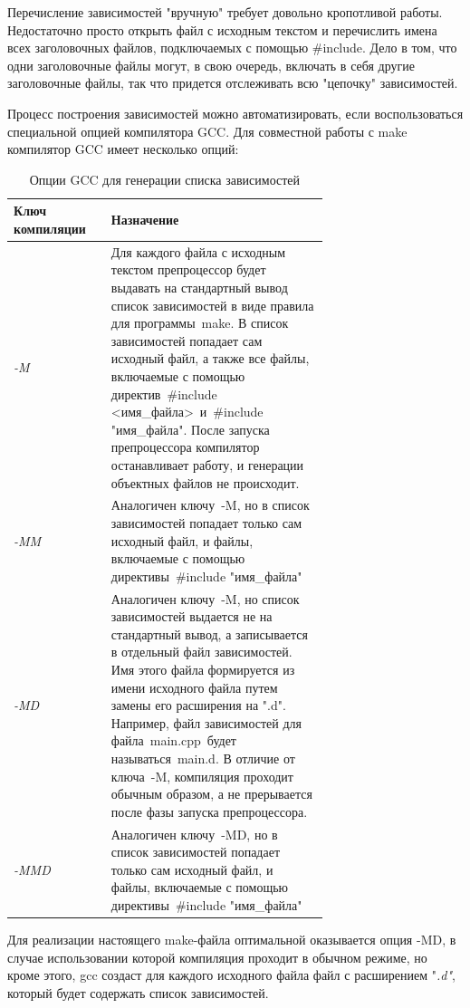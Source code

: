 \documentclass[a4paper,14pt]{extarticle}
\begin{document}
Перечисление зависимостей "вручную" требует довольно кропотливой работы. Недостаточно просто открыть файл с исходным текстом и перечислить имена всех заголовочных файлов, подключаемых с помощью \#include. Дело в том, что одни заголовочные файлы могут, в свою очередь, включать в себя другие заголовочные файлы, так что придется отслеживать всю "цепочку" зависимостей.

Процесс построения зависимостей можно автоматизировать, если воспользоваться специальной опцией компилятора GCC. Для совместной работы с make компилятор GCC имеет несколько опций:

\begin{table}[htbp]
	\small
	\caption{Опции GCC для генерации списка зависимостей}
	\begin{tabular}{|l|p{0.69\linewidth}|}
		\hline
		Ключ компиляции & Назначение \\ \hline
		\textit{-M} & Для каждого файла с исходным текстом препроцессор будет выдавать на стандартный вывод список зависимостей в виде правила для программы make. В список зависимостей попадает сам исходный файл, а также все файлы, включаемые с помощью директив \#include <имя\_файла> и \#include "имя\_файла". После запуска препроцессора компилятор останавливает работу, и генерации объектных файлов не происходит. \\ \hline
		\textit{-MM} & Аналогичен ключу -M, но в список зависимостей попадает только сам исходный файл, и файлы, включаемые с помощью директивы \#include "имя\_файла" \\ \hline
		\textit{-MD} & Аналогичен ключу -M, но список зависимостей выдается не на стандартный вывод, а записывается в отдельный файл зависимостей. Имя этого файла формируется из имени исходного файла путем замены его расширения на ".d". Например, файл зависимостей для файла main.cpp будет называться main.d. В отличие от ключа -M, компиляция проходит обычным образом, а не прерывается после фазы запуска препроцессора. \\ \hline
		\textit{-MMD} & Аналогичен ключу -MD, но в список зависимостей попадает только сам исходный файл, и файлы, включаемые с помощью директивы \#include "имя\_файла" \\ \hline
	\end{tabular}
	\label{tab:gcc-flags}
\end{table}


Для реализации настоящего make-файла оптимальной оказывается опция -MD, в случае использовании которой компиляция проходит в обычном режиме, но кроме этого, gcc создаст для каждого исходного файла файл с расширением "\textit{.d"}, который будет содержать список зависимостей. 
\end{document}
